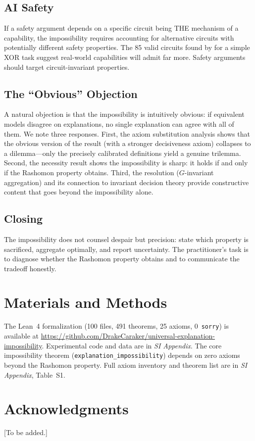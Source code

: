 \documentclass[twocolumn]{article}
\begin{document}
\subsection{AI Safety}

If a safety argument depends on a specific circuit being THE mechanism of
a capability, the impossibility requires accounting for alternative
circuits with potentially different safety properties. The 85 valid
circuits found by \cite{meloux2025everything} for a simple XOR task
suggest real-world capabilities will admit far more. Safety arguments
should target circuit-invariant properties.

\subsection{The ``Obvious'' Objection}

A natural objection is that the impossibility is intuitively obvious: if
equivalent models disagree on explanations, no single explanation can
agree with all of them. We note three responses. First, the axiom
substitution analysis shows that the obvious version of the result (with
a stronger decisiveness axiom) collapses to a dilemma---only the
precisely calibrated definitions yield a genuine trilemma. Second, the
necessity result shows the impossibility is sharp: it holds if and only
if the Rashomon property obtains. Third, the resolution ($G$-invariant
aggregation) and its connection to invariant decision theory provide
constructive content that goes beyond the impossibility alone.



\subsection{Closing}

The impossibility does not counsel despair but precision: state which
property is sacrificed, aggregate optimally, and report uncertainty.
The practitioner's task is to diagnose whether the Rashomon property
obtains and to communicate the tradeoff honestly.

\section*{Materials and Methods}
The Lean~4 formalization (100 files, 491 theorems, 25 axioms,
0~\texttt{sorry}) is available at \url{https://github.com/DrakeCaraker/universal-explanation-impossibility}. Experimental code and
data are in \emph{SI Appendix}. The core impossibility theorem
(\texttt{explanation\_impossibility}) depends on zero axioms beyond the
Rashomon property. Full axiom inventory and theorem list are in
\emph{SI Appendix}, Table~S1.

\section*{Acknowledgments}
[To be added.]



\end{document}
